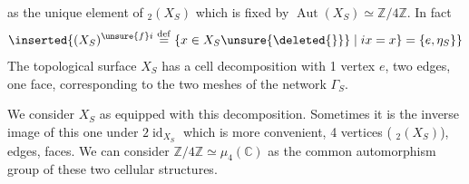 
as the unique element of \({}_2(X_S)\) which
is fixed by $\operatorname{Aut}(X_S)\simeq\mathbb Z/4\mathbb Z$. In fact
\[
\inserted{(X_S)^{\unsure{f}i}\overset{\mathrm{def}}{=}\{x\in X_S\unsure{\deleted{\}}}\mid ix=x\}=\{e,\eta_S\}}
\]
 The topological surface $X_S$ has a
 cell decomposition with 1 vertex $e$, two edges, one face,
 corresponding to the two meshes of the network $\Gamma_S$.

We consider $X_S$ as equipped with this decomposition.
Sometimes it is the inverse image of this one under $2\operatorname{id}_{X_S}$
which is more convenient, 4 vertices ( \({}_2(X_S)\)),
  edges,
  faces.
We can consider $\mathbb Z/4\mathbb Z\simeq\mu_4(\mathbb C)$
as the common automorphism group of these two cellular structures.

